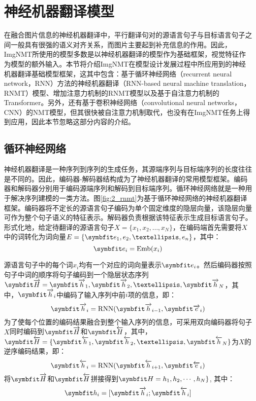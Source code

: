 \section{神经机器翻译模型}
\label{sec:2_nmt}
在融合图片信息的神经机器翻译中，平行翻译句对的源语言句子与目标语言句子之间一般具有很强的语义对齐关系，而图片主要起到补充信息的作用。因此，ImgNMT所使用的模型多数是以神经机器翻译的模型作为基础框架，视觉特征作为模型的额外输入。本节将介绍ImgNMT在模型设计发展过程中所应用到的神经机器翻译基础模型框架，这其中包含：基于循环神经网络（recurrent neural network，RNN）方法的神经机器翻译（RNN-based neural machine translation，RNMT）模型\cite{1_DBLP:journals/corr/SutskeverVL14,2_cho-etal-2014-learning}、增加注意力机制的RNMT模型\cite{3_DBLP:journals/corr/BahdanauCB14,4_luong-etal-2015-effective}以及基于自注意力机制的Transformer\cite{5_DBLP:journals/corr/VaswaniSPUJGKP17}。另外，还有基于卷积神经网络（convolutional neural networks，CNN）的NMT模型\cite{6_DBLP:journals/corr/GehringAGYD17}，但其很快被自注意力机制取代，也没有在ImgNMT任务上得到应用，因此本节忽略这部分内容的介绍。

\subsection{循环神经网络}
\label{sec:2_rnn}

神经机器翻译是一种序列到序列的生成任务，其源端序列与目标端序列的长度往往是不同的。因此，编码器-解码器结构成为了神经机器翻译的常用模型框架。编码器和解码器分别用于编码源端序列和解码到目标端序列。循环神经网络就是一种用于解决序列建模的一类方法。图\ref{fig:2_rnmt}为基于循环神经网络的神经机器翻译框架。编码器将不定长的源语言句子编码为单个固定维度的隐层向量，该隐层向量可作为整个句子语义的特征表示。解码器负责根据该特征表示生成目标语言句子。形式化地，给定待翻译的源语言句子$X=\{x_1,x_2,…,x_N\}$，在编码端首先需要将$X$中的词转化为词向量$E=\{\Vector{e_1,e_2,…,e_n}\}$，其中：
\begin{equation}
    \Vector{e_i}=\mathrm{Emb}(x_i)
\end{equation}

源语言句子中的每个词$x_i$均有一个对应的词向量表示$\Vector{e_i}$。然后编码器按照句子中词的顺序将句子编码到一个隐层状态序列$\rarwvec{H}={\rarwvec{h}_1,\rarwvec{h}_2,…,\rarwvec{h}_N}$，其中，$\rarwvec{h}_i$中编码了输入序列中前$i$项的信息，即：
\begin{equation}
    \rarwvec{h}_i=\mathrm{RNN}(\rarwvec{h}_{i-1},\rarwvec{e}_i)
\end{equation}
为了使每个位置的编码结果融合到整个输入序列的信息，可采用双向编码器将句子$X$同时编码到$\rarwvec{H}$和$\larwvec{H}$，其中，$\larwvec{H}=\{\larwvec{h}_1,\larwvec{h}_2,…,\larwvec{h}_N\}$为$X$的逆序编码结果，即：
\begin{equation}
    \larwvec{h}_i=\mathrm{RNN}(\larwvec{h}_{i+1},\larwvec{e}_i)
\end{equation}
将$\rarwvec{H}$和$\larwvec{H}$拼接得到$\Vector{H=h_1,h_2,\cdots,h_N}\}$, 其中：
\begin{equation}
    \Vector{h_i}=[\rarwvec{h}_i;\larwvec{h}_i]
\end{equation}

